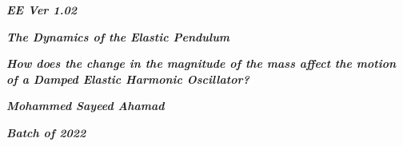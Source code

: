 

\begin{titlepage}
    \begin{center}
        \vspace*{1cm}
            
        \date{}
            
        \huge
            
        \textit{\textbf{EE Ver 1.02}}
            
        \vspace{0.25cm}
            
        \hline
            
        \vspace{2.5cm}
            
        \textit{\textbf{The Dynamics of the Elastic Pendulum}}
            
        \vspace{1cm}
            
        \LARGE
            
        \textit{\textbf{How does the change in the magnitude of the mass affect the motion of a Damped Elastic Harmonic Oscillator? }}
            
        \vspace{2.5cm}
            
        \Large
            
        \textit{\textbf{Mohammed Sayeed Ahamad}}
            
        \vspace{4cm}
            
        \Large
            
        \textit{\textbf{Batch of 2022}}
            
        \vspace{0.25cm}
            
        \hline
           
            
    \end{center}
\end{titlepage}



